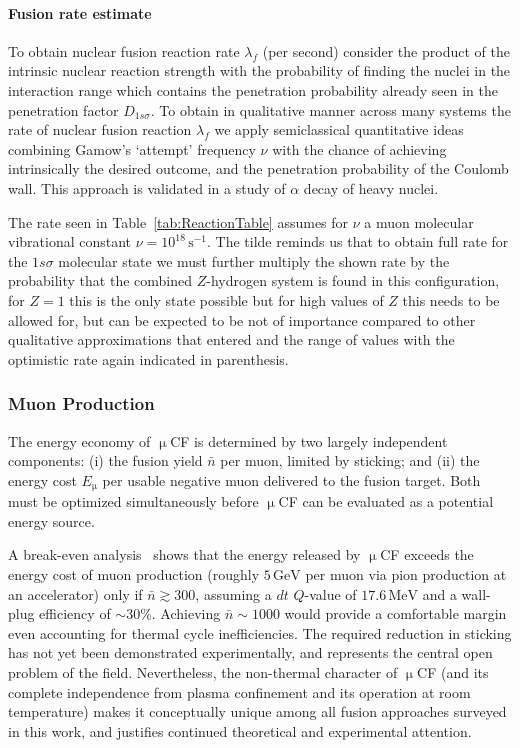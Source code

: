 \documentclass[particles,article,accept,pdftex,moreauthors]{Definitions/mdpi}
\begin{document}
\paragraph*{\bf Fusion rate estimate}
To obtain nuclear fusion reaction rate $\lambda_f$ (per second) consider the product of the intrinsic nuclear reaction strength with the probability of finding the nuclei in the interaction range which contains the penetration probability already seen in the penetration factor $D_{1s\sigma}$. To obtain in qualitative manner across many systems the rate of nuclear fusion reaction $\lambda_f$ we apply semiclassical quantitative ideas combining Gamow's `attempt' frequency $\nu$ with the chance of achieving intrinsically the desired outcome, and the penetration probability of the Coulomb wall. This approach is validated in a study of $\alpha$ decay of heavy nuclei.

The rate seen in Table~\ref{tab:ReactionTable} assumes for $\nu$ a muon molecular vibrational constant $\nu= 10^{18}\,\mathrm{s}^{-1}$. The tilde reminds us that to obtain full rate for the $1s\sigma$ molecular state we must further multiply the shown rate by the probability that the combined $Z$-hydrogen system is found in this configuration, for $Z=1$ this is the only state possible but for high values of $Z$ this needs to be allowed for, but can be expected to be not of importance compared to other qualitative approximations that entered and the range of values with the optimistic rate again indicated in parenthesis.



\subsubsection{Muon Production}\label{sssec:muon_production}
The energy economy of $\upmu$CF is determined by two largely independent components: (i) the fusion yield $\bar{n}$ per muon, limited by sticking; and (ii) the energy cost $E_\upmu$ per usable negative muon delivered to the fusion target. Both must be optimized simultaneously before $\upmu$CF can be evaluated as a potential energy source.

A break-even analysis~\cite{Rafelski:1990in} shows that the energy released by $\upmu$CF exceeds the energy cost of muon production (roughly $5\,\mathrm{GeV}$ per muon via pion production at an accelerator) only if $\bar{n} \gtrsim 300$, assuming a $dt$ $Q$-value of $17.6\,\mathrm{MeV}$ and a wall-plug efficiency of $\sim$30\%. Achieving $\bar{n}\sim 1000$ would provide a comfortable margin even accounting for thermal cycle inefficiencies. The required reduction in sticking has not yet been demonstrated experimentally, and represents the central open problem of the field. Nevertheless, the non-thermal character of $\upmu$CF (and its complete independence from plasma confinement and its operation at room temperature) makes it conceptually unique among all fusion approaches surveyed in this work, and justifies continued theoretical and experimental attention.
\end{document}
